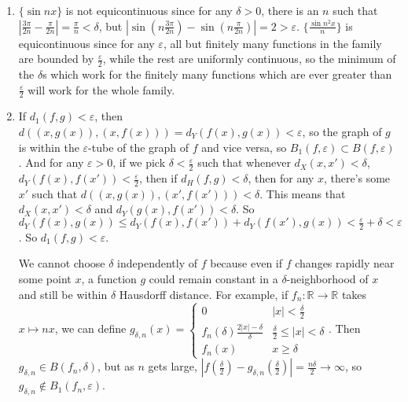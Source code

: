 \documentclass{article}
\newcommand\RR{\mathbb R}
\begin{document}
\begin{enumerate}
   \item $\{\sin nx\}$ is not equicontinuous since for any $\delta>0$, there is
      an $n$ such that $|\frac{3\pi}{2n} - \frac{\pi}{2n}| = \frac\pi{n} <
      \delta$, but $|\sin(n\frac{3\pi}{2n}) - \sin(n\frac{\pi}{2n})| = 2 >
      \varepsilon$.  $\{\frac{\sin n^2x}n\}$ is equicontinuous since for any
      $\varepsilon$, all but finitely many functions in the family are bounded
      by $\frac\varepsilon2$, while the rest are uniformly continuous, so the
      minimum of the $\delta$s which work for the finitely many functions which
      are ever greater than $\frac\varepsilon2$ will work for the whole family.

   \item If $d_1(f,g) < \varepsilon$, then $d( (x,g(x)), (x,f(x))) =
      d_Y(f(x),g(x)) < \varepsilon$, so the graph of $g$ is within the
      $\varepsilon$-tube of the graph of $f$ and vice versa, so
      $B_1(f,\varepsilon) \subset B(f,\varepsilon)$. And for any
      $\varepsilon>0$, if we pick $\delta<\frac\varepsilon2$ such that whenever
      $d_X(x,x') < \delta$, $d_Y(f(x),f(x')) < \frac\varepsilon2$, then if
      $d_H(f,g) < \delta$, then for any $x$, there's some $x'$ such that $d(
      (x,g(x)), (x',f(x'))) < \delta$. This means that $d_X(x,x') < \delta$ and
      $d_Y(g(x),f(x')) < \delta$. So $d_Y(f(x),g(x)) \leq d_Y(f(x),f(x')) +
      d_Y(f(x'),g(x)) < \frac\varepsilon2 + \delta < \varepsilon$. So $d_1(f,g)
      < \varepsilon$.
      
      We cannot choose $\delta$ independently of $f$ because even if $f$ changes
      rapidly near some point $x$, a function $g$ could remain constant in a
      $\delta$-neighborhood of $x$ and still be within $\delta$ Hausdorff
      distance. For example, if $f_n : \RR \to \RR$ takes $x \mapsto nx$, we can
      define $g_{\delta,n}(x) = \begin{cases} 0 & |x| < \frac\delta2 \\
         f_n(\delta)\frac{2|x|-\delta}\delta & \frac\delta2 \leq |x| < \delta
         \\ f_n(x) & x \geq \delta \end{cases}$. Then $g_{\delta,n} \in
      B(f_n,\delta)$, but as $n$ gets large, $|f(\frac\delta2) -
      g_{\delta,n}(\frac\delta2)| = \frac{n\delta}2 \to \infty$, so
      $g_{\delta,n} \not\in B_1(f_n,\varepsilon)$.
\end{enumerate}
\end{document}
